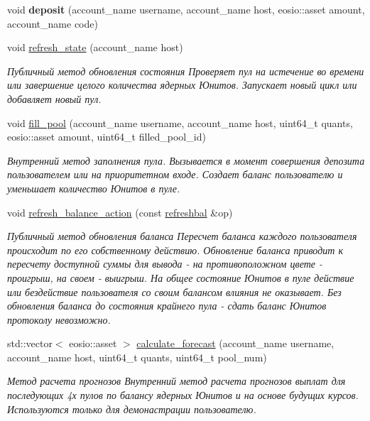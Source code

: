 \begin{DoxyCompactItemize}
\mbox{\label{structeosio_1_1core_afed92df918c207bde2047a062a785e13}} 
void {\bfseries deposit} (account\+\_\+name username, account\+\_\+name host, eosio\+::asset amount, account\+\_\+name code)
\item 
void \mbox{\hyperlink{structeosio_1_1core_afcfd6d8fd630694c723ff06e4cd8cdfe}{refresh\+\_\+state}} (account\+\_\+name host)
\begin{DoxyCompactList}\small\item\em Публичный метод обновления состояния Проверяет пул на истечение во времени или завершение целого количества ядерных Юнитов. Запускает новый цикл или добавляет новый пул. \end{DoxyCompactList}\item 
void \mbox{\hyperlink{structeosio_1_1core_a1638e74f48c2316a81db6e06f7593173}{fill\+\_\+pool}} (account\+\_\+name username, account\+\_\+name host, uint64\+\_\+t quants, eosio\+::asset amount, uint64\+\_\+t filled\+\_\+pool\+\_\+id)
\begin{DoxyCompactList}\small\item\em Внутренний метод заполнения пула. Вызывается в момент совершения депозита пользователем или на приоритетном входе. Создает баланс пользователю и уменьшает количество Юнитов в пуле. \end{DoxyCompactList}\item 
void \mbox{\hyperlink{structeosio_1_1core_aebbed426e5072f1c0f43f051ff3c6e9d}{refresh\+\_\+balance\+\_\+action}} (const \mbox{\hyperlink{structeosio_1_1refreshbal}{refreshbal}} \&op)
\begin{DoxyCompactList}\small\item\em Публичный метод обновления баланса Пересчет баланса каждого пользователя происходит по его собственному действию. Обновление баланса приводит к пересчету доступной суммы для вывода -\/ на противоположном цвете -\/ проигрыш, на своем -\/ выигрыш. На общее состояние Юнитов в пуле действие или бездействие пользователя со своим балансом влияния не оказывает. Без обновления баланса до состояния крайнего пула -\/ сдать баланс Юнитов протоколу невозможно. \end{DoxyCompactList}\item 
std\+::vector$<$ eosio\+::asset $>$ \mbox{\hyperlink{structeosio_1_1core_ada24c50e781f7ed749e93f87ed68491d}{calculate\+\_\+forecast}} (account\+\_\+name username, account\+\_\+name host, uint64\+\_\+t quants, uint64\+\_\+t pool\+\_\+num)
\begin{DoxyCompactList}\small\item\em Метод расчета прогнозов Внутренний метод расчета прогнозов выплат для последующих 4х пулов по балансу ядерных Юнитов и на основе будущих курсов. Используются только для демонастрации пользователю. \end{DoxyCompactList}\item 

\end{DoxyCompactItemize}

